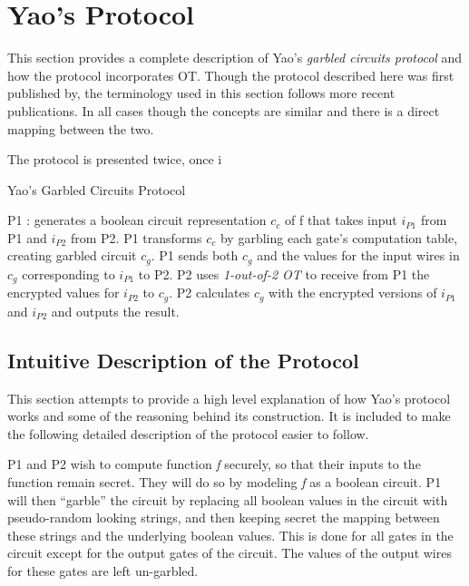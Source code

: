 \section{Yao's Protocol}

This section provides a complete description of Yao's \emph{garbled circuits protocol} and how the protocol incorporates \ac{OT}.  Though the protocol described here was first published by\cite{goldreich1987play}, the terminology used in this section follows more recent publications\cite{hazay2010efficient}. In all cases though the concepts are similar and there is a direct mapping between the two.

The protocol is presented twice, once i

\begin{algorithm}[H]
    \caption{Yao's Garbled Circuits Protocol}
    \label{alg:yao}
    \begin{algorithmic}[1]
        \STATE \ac{P1} : generates a boolean circuit representation $c_c$ of \ac{f} that takes input $i_{P1}$ from \ac{P1} and $i_{P2}$ from \ac{P2}.
        \STATE \ac{P1} transforms $c_c$ by garbling each gate's computation table, creating garbled circuit $c_g$.
        \STATE \ac{P1} sends both $c_g$ and the values for the input wires in $c_g$ corresponding to $i_{P1}$ to \ac{P2}.
        \STATE \ac{P2} uses \emph{1-out-of-2 \ac{OT}} to receive from \ac{P1} the encrypted values for $i_{P2}$ to $c_g$.
        \STATE \ac{P2} calculates $c_g$ with the encrypted versions of $i_{P1}$ and $i_{P2}$ and outputs the result.
    \end{algorithmic}
\end{algorithm}

\subsection{Intuitive Description of the Protocol}

This section attempts to provide a high level explanation of how Yao's protocol works and some of the reasoning behind its construction. It is included to make the following detailed description of the protocol easier to follow.

\ac{P1} and \ac{P2} wish to compute function \emph{f} securely, so that their inputs to the function remain secret. They will do so by modeling \emph{f} as a boolean circuit. \ac{P1} will then ``garble'' the circuit by replacing all boolean values in the circuit with pseudo-random looking strings, and then keeping secret the mapping between these strings and the underlying boolean values. This is done for all gates in the circuit except for the output gates of the circuit.  The values of the output wires for these gates are left un-garbled.

